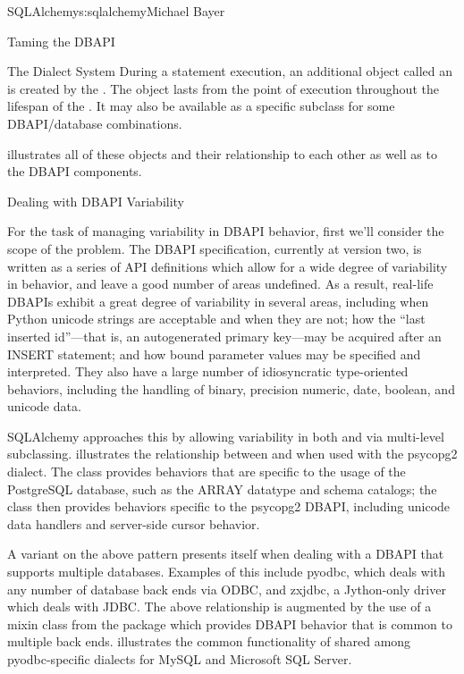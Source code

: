\begin{aosachapter}{SQLAlchemy}{s:sqlalchemy}{Michael Bayer}
\begin{aosasect1}{Taming the DBAPI}
\begin{aosasect2}{The Dialect System}
During a statement execution, an additional object called an
 is created by the . The object lasts from the
point of execution throughout the lifespan of the . It
may also be available as a specific subclass for some DBAPI/database
combinations.

 illustrates all of these objects and their relationship to each
other as well as to the DBAPI components.


\end{aosasect2}

\begin{aosasect2}{Dealing with DBAPI Variability}

For the task of managing variability in DBAPI behavior,
first we'll consider the scope of the problem. The DBAPI
specification, currently at version two, is written as a series of
API definitions which allow for a wide degree of variability in
behavior, and leave a good number of areas undefined.  As a result, real-life
DBAPIs exhibit a great degree of variability
in several areas, including when Python
unicode strings are acceptable and when they are not; how the
``last inserted id''---that is, an autogenerated primary key---may be
acquired after an INSERT statement; and how bound parameter values
may be specified and interpreted. They also have a large number of idiosyncratic type-oriented
behaviors, including the handling of binary, precision numeric, date,
boolean, and unicode data.

SQLAlchemy approaches this by allowing variability in both  and
 via multi-level subclassing.    illustrates
the relationship between  and  when
used with the psycopg2 dialect.  The  class provides behaviors that
are specific to the usage of the PostgreSQL database, such as the ARRAY datatype
and schema catalogs; the 
class then provides behaviors specific to the psycopg2 DBAPI, including
unicode data handlers and server-side cursor behavior.


A variant on the above pattern presents itself when dealing with a DBAPI
that supports multiple databases.   Examples of this include
pyodbc, which deals with any number of database back ends via ODBC,
and zxjdbc, a Jython-only driver which deals with JDBC.   The above
relationship is augmented by the use of a mixin class from the
 package which provides DBAPI behavior that
is common to multiple back ends.   illustrates the common
functionality of  shared among
pyodbc-specific dialects for MySQL and Microsoft SQL Server.


\end{aosasect2}
\end{aosasect1}
\end{aosachapter}
